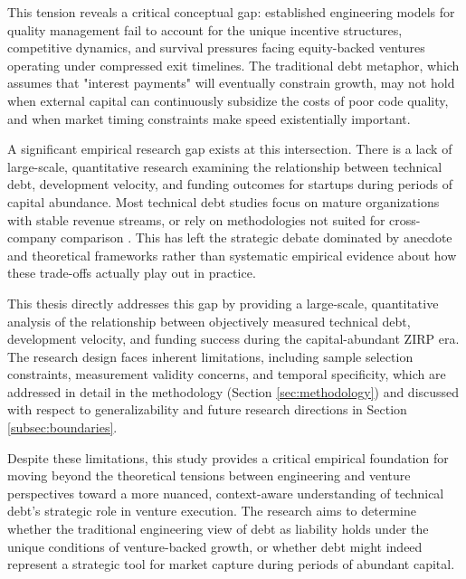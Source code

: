 This tension reveals a critical conceptual gap: established engineering models for quality management fail to account for the unique incentive structures, competitive dynamics, and survival pressures facing equity-backed ventures operating under compressed exit timelines. The traditional debt metaphor, which assumes that "interest payments" will eventually constrain growth, may not hold when external capital can continuously subsidize the costs of poor code quality, and when market timing constraints make speed existentially important.

A significant empirical research gap exists at this intersection. There is a lack of large-scale, quantitative research examining the relationship between technical debt, development velocity, and funding outcomes for startups during periods of capital abundance. Most technical debt studies focus on mature organizations with stable revenue streams, or rely on methodologies not suited for cross-company comparison \citep{li2015systematic}. This has left the strategic debate dominated by anecdote and theoretical frameworks rather than systematic empirical evidence about how these trade-offs actually play out in practice.

This thesis directly addresses this gap by providing a large-scale, quantitative analysis of the relationship between objectively measured technical debt, development velocity, and funding success during the capital-abundant \ac{ZIRP} era. The research design faces inherent limitations, including sample selection constraints, measurement validity concerns, and temporal specificity, which are addressed in detail in the methodology (Section \ref{sec:methodology}) and discussed with respect to generalizability and future research directions in Section \ref{subsec:boundaries}.

Despite these limitations, this study provides a critical empirical foundation for moving beyond the theoretical tensions between engineering and venture perspectives toward a more nuanced, context-aware understanding of technical debt's strategic role in venture execution. The research aims to determine whether the traditional engineering view of debt as liability holds under the unique conditions of venture-backed growth, or whether debt might indeed represent a strategic tool for market capture during periods of abundant capital.